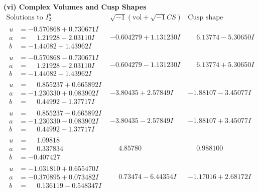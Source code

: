 \documentclass[1p]{elsarticle_modified}
\theoremstyle{definition}
\newcommand{\I}{\sqrt{-1}}
\begin{document}
\newpage\flushleft \textbf{(vi) Complex Volumes and Cusp Shapes}
$$\begin{array}{c|c|c}  
\text{Solutions to }I^u_{2}& \I (\text{vol} + \sqrt{-1}CS) & \text{Cusp shape}\\
 \hline 
\begin{aligned}
u &= -0.570868 + 0.730671 I \\
a &= \phantom{-}1.21928 + 2.03110 I \\
b &= -1.44082 + 1.43962 I\end{aligned}
 & -0.604279 + 1.131230 I & \phantom{-}6.13774 - 5.30650 I \\ \hline\begin{aligned}
u &= -0.570868 - 0.730671 I \\
a &= \phantom{-}1.21928 - 2.03110 I \\
b &= -1.44082 - 1.43962 I\end{aligned}
 & -0.604279 - 1.131230 I & \phantom{-}6.13774 + 5.30650 I \\ \hline\begin{aligned}
u &= \phantom{-}0.855237 + 0.665892 I \\
a &= -1.230330 + 0.083902 I \\
b &= \phantom{-}0.44992 + 1.37717 I\end{aligned}
 & -3.80435 + 2.57849 I & -1.88107 - 3.45077 I \\ \hline\begin{aligned}
u &= \phantom{-}0.855237 - 0.665892 I \\
a &= -1.230330 - 0.083902 I \\
b &= \phantom{-}0.44992 - 1.37717 I\end{aligned}
 & -3.80435 - 2.57849 I & -1.88107 + 3.45077 I \\ \hline\begin{aligned}
u &= \phantom{-}1.09818\phantom{ +0.000000I} \\
a &= \phantom{-}0.337834\phantom{ +0.000000I} \\
b &= -0.407427\phantom{ +0.000000I}\end{aligned}
 & \phantom{-}4.85780\phantom{ +0.000000I} & \phantom{-}0.988100\phantom{ +0.000000I} \\ \hline\begin{aligned}
u &= -1.031810 + 0.655470 I \\
a &= -0.370895 + 0.073482 I \\
b &= \phantom{-}0.136119 - 0.548347 I\end{aligned}
 & \phantom{-}0.73474 - 6.44354 I & -1.17016 + 2.68172 I \\ \hline\begin{aligned}

\end{aligned}
\end{array}$$
\end{document}
